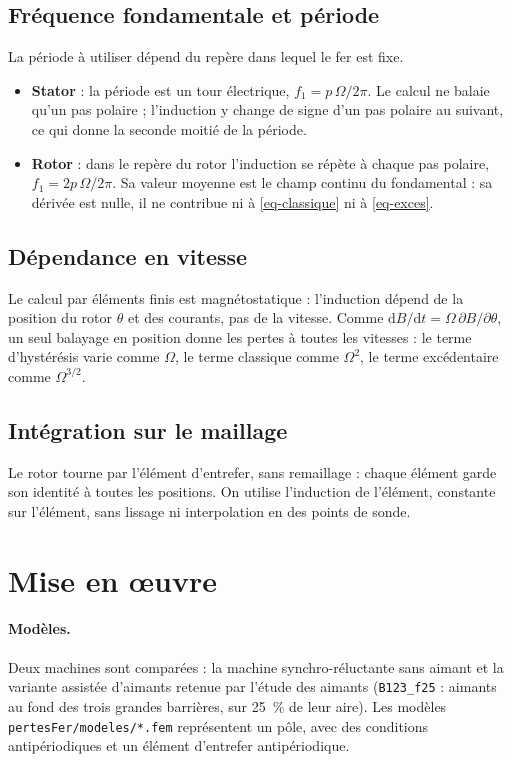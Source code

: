 \documentclass[11pt,a4paper]{article}
\newcommand{\dd}{\mathrm{d}}
\begin{document}
\subsection{Fréquence fondamentale et période}
La période à utiliser dépend du repère dans lequel le fer est fixe.
\begin{itemize}
    \item \textbf{Stator} : la période est un tour électrique, $f_1 = p\,\Omega / 2\pi$. Le calcul ne balaie qu'un pas polaire ; l'induction y change de signe d'un pas polaire au suivant, ce qui donne la seconde moitié de la période.
    \item \textbf{Rotor} : dans le repère du rotor l'induction se répète à chaque pas polaire, $f_1 = 2p\,\Omega / 2\pi$. Sa valeur moyenne est le champ continu du fondamental : sa dérivée est nulle, il ne contribue ni à \eqref{eq-classique} ni à \eqref{eq-exces}.
\end{itemize}

\subsection{Dépendance en vitesse}
Le calcul par éléments finis est magnétostatique : l'induction dépend de la position du rotor $\theta$ et des courants, pas de la vitesse. Comme $\dd B/\dd t = \Omega\, \partial B/\partial\theta$, un seul balayage en position donne les pertes à toutes les vitesses : le terme d'hystérésis varie comme $\Omega$, le terme classique comme $\Omega^2$, le terme excédentaire comme $\Omega^{3/2}$.

\subsection{Intégration sur le maillage}
Le rotor tourne par l'élément d'entrefer, sans remaillage : chaque élément garde son identité à toutes les positions. On utilise l'induction de l'élément, constante sur l'élément, sans lissage ni interpolation en des points de sonde.

\section{Mise en œuvre}\label{sec-calcul}

\paragraph{Modèles.} Deux machines sont comparées : la machine synchro-réluctante sans aimant et la variante assistée d'aimants retenue par l'étude des aimants (\texttt{B123\_f25} : aimants au fond des trois grandes barrières, sur \SI{25}{\percent} de leur aire). Les modèles \texttt{pertesFer/modeles/*.fem} représentent un pôle, avec des conditions antipériodiques et un élément d'entrefer antipériodique.
\end{document}
